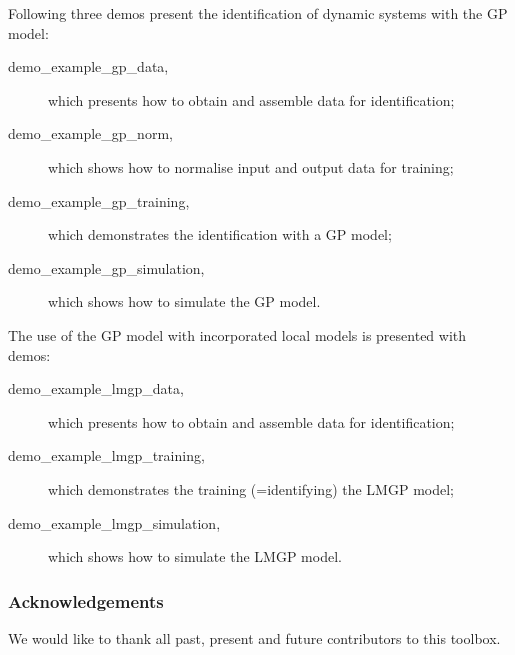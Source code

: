 \documentclass[12pt,twoside]{article}
\begin{document}
 Following three demos present the identification of dynamic
 systems with the GP model:
 \begin{description}
 \item [demo\_example\_gp\_data,] which presents how to obtain and
 assemble data for identification;
 \item [demo\_example\_gp\_norm,] which shows how to normalise input and output data for training;
 \item [demo\_example\_gp\_training,] which demonstrates the
 identification with a GP model;
 \item [demo\_example\_gp\_simulation,] which shows how to simulate
 the GP model.

 \end{description}

 The use of the GP model with incorporated local models is
 presented with demos:
 \begin{description}
 \item [demo\_example\_lmgp\_data,] which presents how to obtain and
 assemble data for identification;
 \item [demo\_example\_lmgp\_training,] which demonstrates the
 training (=identifying) the LMGP model;
 \item [demo\_example\_lmgp\_simulation,] which shows how to simulate
 the LMGP model.
 \end{description}

\subsubsection{Acknowledgements}
We would like to thank all past, present and future contributors to this toolbox.
\end{document}
